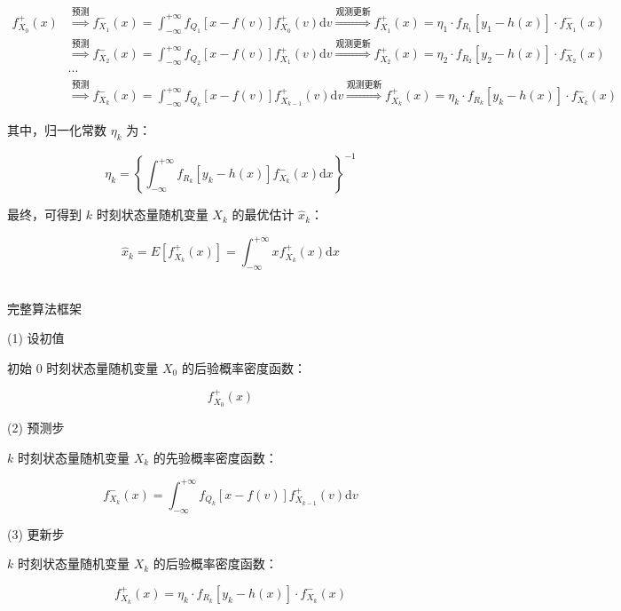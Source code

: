 \documentclass[12pt]{ctexart}
\begin{document}
\begin{equation}
\begin{aligned}
f_{X_0}^+(x) & \stackrel{\text{预测}}{\Longrightarrow} f_{X_1}^-(x)=\int_{-\infty}^{+\infty}f_{Q_1}[x-f(v)]f_{X_0}^+(v)\mathrm{d}v \stackrel{\text{观测更新}}{\Longrightarrow} f_{X_1}^+(x)=\eta_1·f_{R_1}[y_1-h(x)]·f_{X_1}^-(x) \\
& \stackrel{\text{预测}}{\Longrightarrow} f_{X_2}^-(x)=\int_{-\infty}^{+\infty}f_{Q_2}[x-f(v)]f_{X_1}^+(v)\mathrm{d}v \stackrel{\text{观测更新}}{\Longrightarrow} f_{X_2}^+(x)=\eta_2·f_{R_2}[y_2-h(x)]·f_{X_2}^-(x) \\
& \cdots \\
& \stackrel{\text{预测}}{\Longrightarrow} f_{X_k}^-(x)=\int_{-\infty}^{+\infty}f_{Q_k}[x-f(v)]f_{X_{k-1}}^+(v)\mathrm{d}v \stackrel{\text{观测更新}}{\Longrightarrow} f_{X_k}^+(x)=\eta_k·f_{R_k}[y_k-h(x)]·f_{X_k}^-(x)
\end{aligned}
\end{equation}

其中，归一化常数 \(\eta_k\) 为：

\begin{equation}
\eta_k=\left\{\int_{-\infty}^{+\infty}f_{R_k}[y_k-h(x)]f_{X_k}^-(x)\mathrm{d}x\right\}^{-1}
\end{equation}

最终，可得到 \(k\) 时刻状态量随机变量 \(X_k\) 的最优估计 \(\hat{x}_k\)：

\begin{equation}
\hat{x}_k=E[f_{X_k}^+(x)]=\int_{-\infty}^{+\infty}xf_{X_k}^+(x)\mathrm{d}x
\end{equation}

\par
~\\
\textcolor{myblue}{完整算法框架}

(1) 设初值

初始 0 时刻状态量随机变量 \(X_0\) 的后验概率密度函数：

\[f_{X_0}^+(x)\]

(2) 预测步

\(k\) 时刻状态量随机变量 \(X_k\) 的先验概率密度函数：

\[f_{X_k}^-(x)=\int_{-\infty}^{+\infty}f_{Q_k}[x-f(v)]f_{X_{k-1}}^+(v)\mathrm{d}v\]

(3) 更新步

\(k\) 时刻状态量随机变量 \(X_k\) 的后验概率密度函数：

\[f_{X_k}^+(x)=\eta_k·f_{R_k}[y_k-h(x)]·f_{X_k}^-(x)\]
\end{document}
